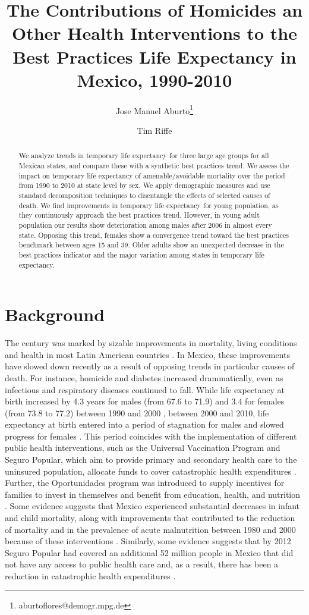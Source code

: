 \documentclass{article}
\title{The Contributions of Homicides an Other Health Interventions to the  Best Practices Life Expectancy in Mexico, 1990-2010}
\author[1]{Jose Manuel Aburto\thanks{aburtoflores@demogr.mpg.de}}
\author[2]{Tim Riffe}
\affil[1]{Max Planck Institute for Demographic Research, EDSD}
\affil[2]{Max Planck Institute for Demographic Research}
\begin{document}
\maketitle

\begin{abstract}
We analyze trends in temporary life expectancy for three large age groups for
all Mexican states, and compare these with a synthetic best practices trend. We assess the impact on temporary life expectancy of amenable/avoidable mortality over the period from 1990 to 2010 at state level by sex. We apply demographic measures and use standard decomposition techniques to disentangle the effects of selected causes of death. We find improvements in temporary life expectancy for young population, as they continuously approach the best practices trend. However, in young adult population our results show deterioration among males after 2006 in almost every state. Opposing this trend, females show a convergence trend toward the best practices benchmark between ages 15 and 39. Older adults show an unexpected decrease in the best practices indicator and the major variation among states in temporary life expectancy. 



\end{abstract}


\section*{Background}
The  century was marked by sizable improvements in mortality, living
conditions and health in most Latin American countries \citep{who2000}. In
Mexico, these improvements have slowed down recently as a result of opposing
trends in particular causes of death. For instance, homicide and diabetes
increased drammatically, even as infectious and
respiratory diseases continued to fall. While life
expectancy at birth increased by 4.3 years for males (from 67.6 to 71.9) and 3.4
for females (from 73.8 to 77.2) between 1990 and 2000 \citep{SOMEDE},
between 2000 and 2010, life expectancy at birth entered into a period of
stagnation for males and slowed progress for females \citep{canudas2014}. This
period coincides with the implementation of different public health
interventions, such as the Universal Vaccination Program and Seguro
Popular, which aim to provide primary and secondary
health care to the uninsured population, allocate funds to cover catastrophic
health expenditures \citep{knaul2005}. Further, the Oportunidades program
was introduced to supply incentives for families to invest in themselves and
benefit from education, health, and nutrition \citep{neufeld2012}. Some evidence
suggests that Mexico experienced substantial decreases in infant and child
mortality, along with improvements that contributed to the reduction of
mortality and in the prevalence of acute malnutrition between 1980 and 2000
because of these interventions \citep{sepulveda2006}. Similarly, some evidence
suggests that by 2012 Seguro Popular had covered an additional 52 million
people in Mexico that did not have any access to public health care and, as a result, there has been a reduction in catastrophic health expenditures \citep{knaul2012}.
\end{document}
